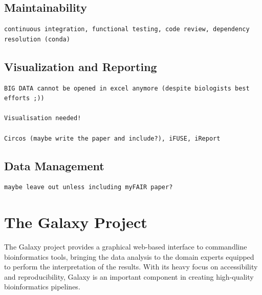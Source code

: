 \subsection{Maintainability}

\begin{verbatim}
continuous integration, functional testing, code review, dependency resolution (conda)
\end{verbatim}

\subsection{Visualization and Reporting}

\begin{verbatim}
BIG DATA cannot be opened in excel anymore (despite biologists best efforts ;))

Visualisation needed!

Circos (maybe write the paper and include?), iFUSE, iReport
\end{verbatim}

\subsection{Data Management}
\begin{verbatim}
maybe leave out unless including myFAIR paper?
\end{verbatim}

\section{The Galaxy Project}
The Galaxy project \cite{afgan2016galaxy} provides a graphical web-based interface to commandline bioinformatics tools, bringing the data analysis to the domain experts equipped to perform the interpretation of the results. With its heavy focus on accessibility and reproducibility, Galaxy is an important component in creating high-quality bioinformatics pipelines.


